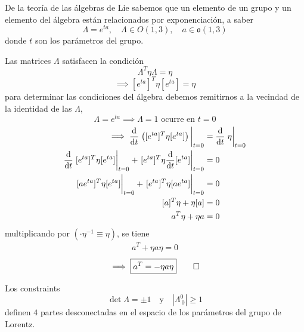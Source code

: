 \begin{prueba}
	De la teoría de las álgebras de Lie sabemos que un elemento de un grupo y un elemento del álgebra están relacionados por exponenciación, a saber
	\begin{equation}
  \Lambda=e^{ta},\quad \Lambda\in O(1,3),\quad a\in \mathfrak{o}(1,3)
\end{equation}
donde $t$ son los parámetros del grupo.

Las matrices $\Lambda$ satisfacen la condición
\begin{equation}
  \Lambda^T\eta\Lambda=\eta
\end{equation}
\begin{equation}
  \implies [e^{ta}]^T\eta [e^{ta}]=\eta 
\end{equation}
para determinar las condiciones del álgebra debemos remitirnos a la vecindad de la identidad de las $\Lambda$,
\begin{equation}
  \Lambda =e^{ta}\implies \Lambda=1\text{ ocurre en } t=0
\end{equation}
\begin{align}
  \implies \dv{t}\eval{\left([e^{ta}]^T\eta [e^{ta}]\right)}_{t=0}&=\dv{t}\eval{\eta}_{t=0}\\
  \dv{t}\eval{[e^{ta}]^T\eta [e^{ta}]}_{t=0}+\eval{[e^{ta}]^T\eta \dv{t}[e^{ta}]}_{t=0}&=0\\
  \eval{[ae^{ta}]^T\eta [e^{ta}]}_{t=0}+\eval{[e^{ta}]^T\eta [ae^{ta}]}_{t=0}&=0\\
  [a]^T\eta +\eta [a]&=0\\
  a^T\eta +\eta a&=0
\end{align}
multiplicando por $(\cdot \eta^{-1}\equiv\eta )$, se tiene
\begin{align}
  a^T+\eta a\eta=0
\end{align}
\begin{equation}
  \implies \boxed{a^T=-\eta a\eta} \qed 
\end{equation}
\end{prueba}

\begin{teor}
	Los constraints
	\begin{equation}
  \det\Lambda=\pm 1\quad \text{y}\quad |\Lambda^0_{~0}|\geq 1
\end{equation}
definen $4$ partes desconectadas en el espacio de los parámetros del grupo de Lorentz.
\end{teor}

